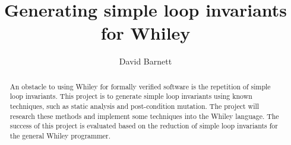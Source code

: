 \documentclass[11pt, a4paper, twoside, openright]{report}
\title{Generating simple loop invariants for Whiley}
\author{David Barnett}
\date{}
\begin{document}
\frontmatter


\begin{abstract}
    An obstacle to using Whiley for formally verified software is the 
    repetition of simple loop invariants.
    This project is to generate simple loop invariants using
    known techniques, such as static analysis and post-condition mutation.
    The project will research these methods and implement some techniques
    into the Whiley language.
    The success of this project is evaluated based on the reduction
    of simple loop invariants for the general Whiley programmer.
\end{abstract}


\maketitle




\mainmatter


%
\end{document}
